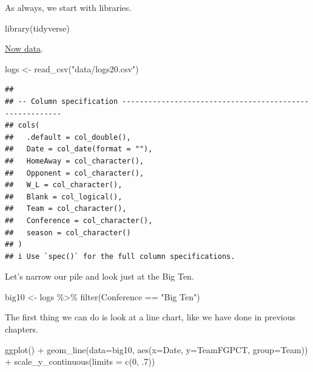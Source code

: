 \documentclass[
]{book}
\newenvironment{Shaded}{\begin{snugshade}}{\end{snugshade}}
\newcommand{\AttributeTok}[1]{\textcolor[rgb]{0.77,0.63,0.00}{#1}}
\newcommand{\DecValTok}[1]{\textcolor[rgb]{0.00,0.00,0.81}{#1}}
\newcommand{\FunctionTok}[1]{\textcolor[rgb]{0.00,0.00,0.00}{#1}}
\newcommand{\NormalTok}[1]{#1}
\newcommand{\OtherTok}[1]{\textcolor[rgb]{0.56,0.35,0.01}{#1}}
\newcommand{\SpecialCharTok}[1]{\textcolor[rgb]{0.00,0.00,0.00}{#1}}
\newcommand{\StringTok}[1]{\textcolor[rgb]{0.31,0.60,0.02}{#1}}
\begin{document}
As always, we start with libraries.

\begin{Shaded}
\begin{Highlighting}[]
\FunctionTok{library}\NormalTok{(tidyverse)}
\end{Highlighting}
\end{Shaded}

\href{https://unl.box.com/s/yc01x7ae7r2jtuixo4j3s3s0ed7o5f8g}{Now data}.

\begin{Shaded}
\begin{Highlighting}[]
\NormalTok{logs }\OtherTok{\textless{}{-}} \FunctionTok{read\_csv}\NormalTok{(}\StringTok{"data/logs20.csv"}\NormalTok{)}
\end{Highlighting}
\end{Shaded}

\begin{verbatim}
## 
## -- Column specification --------------------------------------------------------
## cols(
##   .default = col_double(),
##   Date = col_date(format = ""),
##   HomeAway = col_character(),
##   Opponent = col_character(),
##   W_L = col_character(),
##   Blank = col_logical(),
##   Team = col_character(),
##   Conference = col_character(),
##   season = col_character()
## )
## i Use `spec()` for the full column specifications.
\end{verbatim}

Let's narrow our pile and look just at the Big Ten.

\begin{Shaded}
\begin{Highlighting}[]
\NormalTok{big10 }\OtherTok{\textless{}{-}}\NormalTok{ logs }\SpecialCharTok{\%\textgreater{}\%} \FunctionTok{filter}\NormalTok{(Conference }\SpecialCharTok{==} \StringTok{"Big Ten"}\NormalTok{)}
\end{Highlighting}
\end{Shaded}

The first thing we can do is look at a line chart, like we have done in previous chapters.

\begin{Shaded}
\begin{Highlighting}[]
\FunctionTok{ggplot}\NormalTok{() }\SpecialCharTok{+} 
  \FunctionTok{geom\_line}\NormalTok{(}\AttributeTok{data=}\NormalTok{big10, }\FunctionTok{aes}\NormalTok{(}\AttributeTok{x=}\NormalTok{Date, }\AttributeTok{y=}\NormalTok{TeamFGPCT, }\AttributeTok{group=}\NormalTok{Team)) }\SpecialCharTok{+} 
  \FunctionTok{scale\_y\_continuous}\NormalTok{(}\AttributeTok{limits =} \FunctionTok{c}\NormalTok{(}\DecValTok{0}\NormalTok{, .}\DecValTok{7}\NormalTok{))}
\end{Highlighting}
\end{Shaded}
\end{document}
